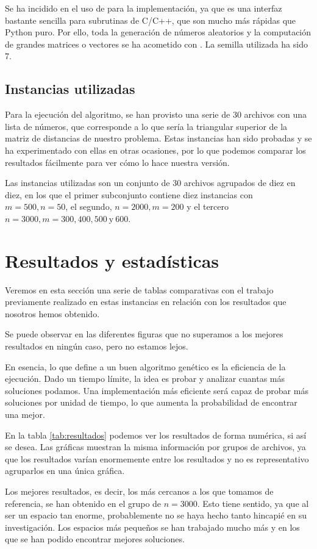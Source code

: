 Se ha incidido en el uso de  para la implementación, ya que es una interfaz bastante sencilla para subrutinas de C/C++, que son mucho más rápidas que Python puro. Por ello, toda la generación de números aleatorios y la computación de grandes matrices o vectores se ha acometido con . La semilla utilizada ha sido 7.

\subsection{Instancias utilizadas}
Para la ejecución del algoritmo, se han provisto una serie de 30 archivos con una lista de números, que corresponde a lo que sería la triangular superior de la matriz de distancias de nuestro problema. Estas instancias han sido probadas y se ha experimentado con ellas en otras ocasiones, por lo que podemos comparar los resultados fácilmente para ver cómo lo hace nuestra versión.

Las instancias utilizadas son un conjunto de 30 archivos agrupados de diez en diez, en los que el primer subconjunto contiene diez instancias con $m = 500, n=50$, el segundo, $n = 2000, m = 200$ y el tercero $n = 3000, m = 300, 400, 500 \ \text{y} \ 600$.

\newpage
\section{Resultados y estadísticas}
Veremos en esta sección una serie de tablas comparativas con el trabajo previamente realizado en estas instancias en relación con los resultados que nosotros hemos obtenido.

Se puede observar en las diferentes figuras que no superamos a los mejores resultados en ningún caso, pero no estamos lejos.

En esencia, lo que define a un buen algoritmo genético es la eficiencia de la ejecución. Dado un tiempo límite, la idea es probar y analizar cuantas más soluciones podamos. Una implementación más eficiente será capaz de probar más soluciones por unidad de tiempo, lo que aumenta la probabilidad de encontrar una mejor.

En la tabla \ref{tab:resultados} podemos ver los resultados de forma numérica, si así se desea. Las gráficas muestran la misma información por grupos de archivos, ya que los resultados varían enormemente entre los resultados y no es representativo agruparlos en una única gráfica.

Los mejores resultados, es decir, los más cercanos a los que tomamos de referencia, se han obtenido en el grupo de $n = 3000$. Esto tiene sentido, ya que al ser un espacio tan enorme, probablemente no se haya hecho tanto hincapié en su investigación. Los espacios más pequeños se han trabajado mucho más y en los que se han podido encontrar mejores soluciones.

